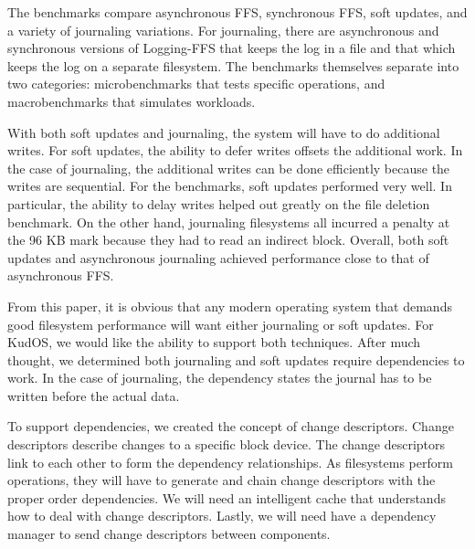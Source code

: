The benchmarks compare asynchronous FFS, synchronous FFS, soft
updates, and a variety of journaling variations. For journaling, there
are asynchronous and synchronous versions of Logging-FFS that keeps
the log in a file and that which keeps the log on a separate
filesystem. The benchmarks themselves separate into two categories:
microbenchmarks that tests specific operations, and macrobenchmarks
that simulates workloads.

With both soft updates and journaling, the system will have to do
additional writes. For soft updates, the ability to defer writes
offsets the additional work. In the case of journaling, the additional
writes can be done efficiently because the writes are sequential. For
the benchmarks, soft updates performed very well. In particular, the
ability to delay writes helped out greatly on the file deletion
benchmark. On the other hand, journaling filesystems all incurred a
penalty at the 96 KB mark because they had to read an indirect
block. Overall, both soft updates and asynchronous journaling achieved
performance close to that of asynchronous FFS.

From this paper, it is obvious that any modern operating system that
demands good filesystem performance will want either journaling or
soft updates. For KudOS, we would like the ability to support both
techniques. After much thought, we determined both journaling and soft
updates require dependencies to work. In the case of journaling, the
dependency states the journal has to be written before the actual
data.

To support dependencies, we created the concept of change
descriptors. Change descriptors describe changes to a specific block
device. The change descriptors link to each other to form the
dependency relationships. As filesystems perform operations, they will
have to generate and chain change descriptors with the proper
order dependencies. We will need an intelligent cache that understands
how to deal with change descriptors. Lastly, we will need have a
dependency manager to send change descriptors between components.
